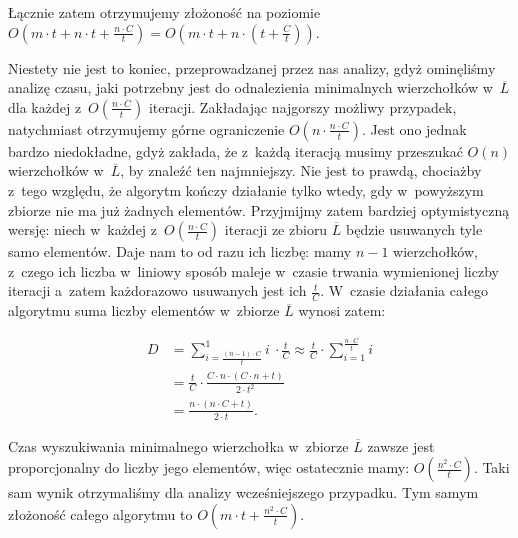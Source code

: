 Łącznie zatem otrzymujemy złożoność na poziomie $ O \left( m \cdot t + n \cdot t + \frac{n \cdot C}{t} \right) = O \left( m \cdot t + n \cdot \left( t + \frac{C}{t}\right) \right)$.

Niestety nie jest to koniec, przeprowadzanej przez nas analizy, gdyż ominęliśmy analizę czasu, jaki potrzebny jest do odnalezienia minimalnych wierzchołków w~$\overline{L}$ dla każdej z~$ O \left( \frac{n \cdot C}{t}\right)$ iteracji. Zakładając najgorszy możliwy przypadek, natychmiast otrzymujemy górne ograniczenie $O \left( n \cdot \frac{n \cdot C}{t} \right)$. Jest ono jednak bardzo niedokładne, gdyż zakłada, że z~każdą iteracją musimy przeszukać $O \left( n \right)$ wierzchołków w~$\overline{L}$, by znaleźć ten najmniejszy. Nie jest to prawdą, chociażby z~tego względu, że algorytm kończy działanie tylko wtedy, gdy w~powyższym zbiorze nie ma już żadnych elementów. Przyjmijmy zatem bardziej optymistyczną wersję: niech w~każdej z~$ O \left( \frac{n \cdot C}{t}\right)$ iteracji ze zbioru $\overline{L}$ będzie usuwanych tyle samo elementów. Daje nam to od razu ich liczbę: mamy $n-1$ wierzchołków, z~czego ich liczba w~liniowy sposób maleje w~czasie trwania wymienionej liczby iteracji a~zatem każdorazowo usuwanych jest ich $\frac{t}{C}$. W~czasie działania całego algorytmu suma liczby elementów w~zbiorze $\overline{L}$ wynosi zatem: 

\begin{equation}
	\begin{aligned}
		D &= \sum_{i=\frac{ \left( n-1 \right) \cdot C}{t}}^{1} i~\cdot \frac{t}{C} \approx \frac{t}{C} \cdot \sum_{i=1}^{\frac{n \cdot C}{t}} i\\
		&= \frac{t}{C} \cdot \frac{C \cdot n \cdot \left( C \cdot n + t \right)}{2 \cdot t^{2}} \\
		&= \frac{n \cdot \left( n \cdot C + t \right)}{2 \cdot t}.
	\end{aligned}
\end{equation}

Czas wyszukiwania minimalnego wierzchołka w~zbiorze $\overline{L}$ zawsze jest proporcjonalny do liczby jego elementów, więc ostatecznie mamy: $ O \left( \frac{n^{2} \cdot C}{t}\right)$. Taki sam wynik otrzymaliśmy dla analizy wcześniejszego przypadku. Tym samym złożoność całego algorytmu to $ O \left( m \cdot t + \frac{n^{2} \cdot C}{t}\right)$.

